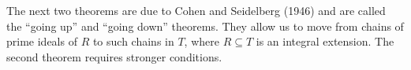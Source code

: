 The next two theorems are due to Cohen and Seidelberg (1946) and are
called the \enquote{going up} and \enquote{going down} theorems. They
allow us to move from chains of prime ideals of $R$ to such chains in
$T$, where $R \subseteq T$ is an integral extension. The second theorem requires
stronger conditions.
